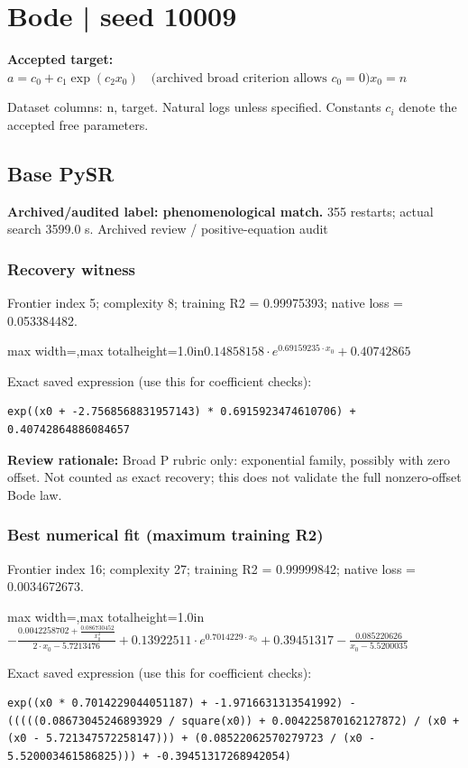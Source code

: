 \documentclass[10pt,letterpaper,landscape]{article}
\begin{document}
\section*{Bode | seed 10009}
\textbf{Accepted target:} $\displaystyle a=c_0+c_1\exp(c_2x_0)\quad\text{(archived broad criterion allows }c_0=0\text{)}$\hfill $x_0=n$\par
{\small Dataset columns: n, target. Natural logs unless specified. Constants $c_i$ denote the accepted free parameters.}\par\medskip
\begin{minipage}[t]{0.485\textwidth}
\subsection*{Base PySR}
\textbf{Archived/audited label: phenomenological match.} 355 restarts; actual search 3599.0 s.
{\small Archived review / positive-equation audit}
\subsubsection*{Recovery witness}
Frontier index 5; complexity 8; training R2 = 0.99975393; native loss = 0.053384482.
\begin{center}\begin{adjustbox}{max width=\linewidth,max totalheight=1.0in}$\displaystyle 0.14858158 \cdot e^{0.69159235 \cdot x_{0}} + 0.40742865$\end{adjustbox}\end{center}
{\scriptsize Exact saved expression (use this for coefficient checks):}
\begin{lstlisting}
exp((x0 + -2.7568568831957143) * 0.6915923474610706) + 0.40742864886084657
\end{lstlisting}
{\small\textbf{Review rationale:} Broad P rubric only: exponential family, possibly with zero offset. Not counted as exact recovery; this does not validate the full nonzero-offset Bode law.}
\subsubsection*{Best numerical fit (maximum training R2)}
Frontier index 16; complexity 27; training R2 = 0.99999842; native loss = 0.0034672673.
\begin{center}\begin{adjustbox}{max width=\linewidth,max totalheight=1.0in}$\displaystyle - \frac{0.0042258702 + \frac{0.086730452}{x_{0}^{2}}}{2 \cdot x_{0} - 5.7213476} + 0.13922511 \cdot e^{0.7014229 \cdot x_{0}} + 0.39451317 - \frac{0.085220626}{x_{0} - 5.5200035}$\end{adjustbox}\end{center}
{\scriptsize Exact saved expression (use this for coefficient checks):}
\begin{lstlisting}
exp((x0 * 0.7014229044051187) + -1.9716631313541992) - (((((0.08673045246893929 / square(x0)) + 0.004225870162127872) / (x0 + (x0 - 5.721347572258147))) + (0.08522062570279723 / (x0 - 5.520003461586825))) + -0.39451317268942054)
\end{lstlisting}
\end{minipage}\hfill
\end{document}
